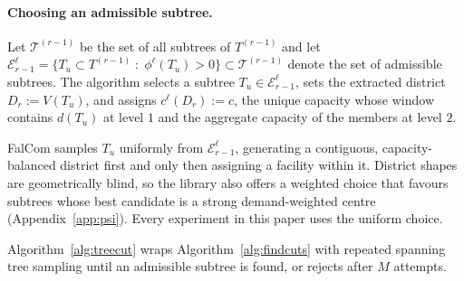 \documentclass[preprint,12pt,authoryear]{elsarticle}
\theoremstyle{definition}
\begin{document}
\paragraph{Choosing an admissible subtree.} Let $\mathcal{T}^{(r-1)}$ be the set of all subtrees of $T^{(r-1)}$ and let $\mathcal{E}^{\ell}_{r-1} = \{T_u \subset T^{(r-1)} \; : \; \phi^{\ell}(T_u) > 0 \} \subset \mathcal{T}^{(r-1)}$ denote the set of admissible subtrees. The algorithm selects a subtree $T_u \in \mathcal{E}^{\ell}_{r-1}$, sets the extracted district $D_r := V(T_u)$, and assigns $c^{\ell}(D_r) := c$, the unique capacity whose window contains $d(T_u)$ at level $1$ and the aggregate capacity of the members at level $2$. 

FalCom samples $T_u$ uniformly from $\mathcal{E}^{\ell}_{r-1}$, generating a contiguous, capacity-balanced district first and only then assigning a facility within it. District shapes are geometrically blind, so the library also offers a weighted choice that favours subtrees whose best candidate is a strong demand-weighted centre (Appendix~\ref{app:psi}). Every experiment in this paper uses the uniform choice.

Algorithm~\ref{alg:treecut} wraps Algorithm~\ref{alg:findcuts} with repeated spanning tree sampling until an admissible subtree is found, or rejects after $M$ attempts.

\medskip

\begin{algorithm}[H]
\LinesNumbered
\caption{Capacitated Tree Cut}\label{alg:treecut}
\vspace{1mm}

\BlankLine

\end{algorithm}
\end{document}
